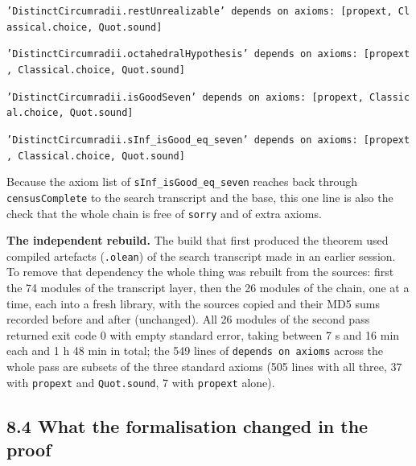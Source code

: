 \documentclass[11pt,a4paper]{article}
\theoremstyle{named}
\begin{document}
\begin{leancode}
\item \texttt{'DistinctCircumradii.\allowbreak{}restUnrealizable'\ \allowbreak{}depends\ \allowbreak{}on\ \allowbreak{}axioms:\ \allowbreak{}[propext,\ \allowbreak{}Classical.\allowbreak{}choice,\ \allowbreak{}Quot.\allowbreak{}sound]}
\item \texttt{'DistinctCircumradii.\allowbreak{}octahedralHypothesis'\ \allowbreak{}depends\ \allowbreak{}on\ \allowbreak{}axioms:\ \allowbreak{}[propext,\ \allowbreak{}Classical.\allowbreak{}choice,\ \allowbreak{}Quot.\allowbreak{}sound]}
\item \texttt{'DistinctCircumradii.\allowbreak{}isGoodSeven'\ \allowbreak{}depends\ \allowbreak{}on\ \allowbreak{}axioms:\ \allowbreak{}[propext,\ \allowbreak{}Classical.\allowbreak{}choice,\ \allowbreak{}Quot.\allowbreak{}sound]}
\item \texttt{'DistinctCircumradii.\allowbreak{}sInf\_\allowbreak{}isGood\_\allowbreak{}eq\_\allowbreak{}seven'\ \allowbreak{}depends\ \allowbreak{}on\ \allowbreak{}axioms:\ \allowbreak{}[propext,\ \allowbreak{}Classical.\allowbreak{}choice,\ \allowbreak{}Quot.\allowbreak{}sound]}
\end{leancode}

Because the axiom list of \texttt{sInf\_\allowbreak{}isGood\_\allowbreak{}eq\_\allowbreak{}seven} reaches back through \texttt{censusComplete} to the search transcript and the base, this one line is also the check that the whole chain is free of \texttt{sorry} and of extra axioms.

\textbf{The independent rebuild.} The build that first produced the theorem used compiled artefacts (\texttt{.\allowbreak{}olean}) of the search transcript made in an earlier session. To remove that dependency the whole thing was rebuilt from the sources: first the 74 modules of the transcript layer, then the 26 modules of the chain, one at a time, each into a fresh library, with the sources copied and their MD5 sums recorded before and after (unchanged). All 26 modules of the second pass returned exit code 0 with empty standard error, taking between 7 s and 16 min each and 1 h 48 min in total; the 549 lines of \texttt{depends\ \allowbreak{}on\ \allowbreak{}axioms} across the whole pass are subsets of the three standard axioms (505 lines with all three, 37 with \texttt{propext} and \texttt{Quot.\allowbreak{}sound}, 7 with \texttt{propext} alone).

\subsection*{8.4 What the formalisation changed in the proof}
\end{document}
